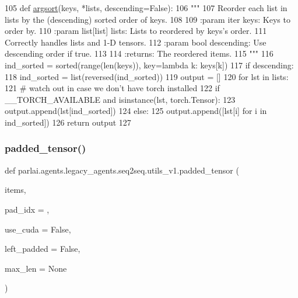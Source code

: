 \begin{DoxyCode}
105 \textcolor{keyword}{def }\hyperlink{namespaceparlai_1_1agents_1_1legacy__agents_1_1seq2seq_1_1utils__v1_a1521e559b740f741ebb47b8755202bb2}{argsort}(keys, *lists, descending=False):
106     \textcolor{stringliteral}{"""}
107 \textcolor{stringliteral}{    Reorder each list in lists by the (descending) sorted order of keys.}
108 \textcolor{stringliteral}{}
109 \textcolor{stringliteral}{    :param iter keys: Keys to order by.}
110 \textcolor{stringliteral}{    :param list[list] lists: Lists to reordered by keys's order.}
111 \textcolor{stringliteral}{                             Correctly handles lists and 1-D tensors.}
112 \textcolor{stringliteral}{    :param bool descending: Use descending order if true.}
113 \textcolor{stringliteral}{}
114 \textcolor{stringliteral}{    :returns: The reordered items.}
115 \textcolor{stringliteral}{    """}
116     ind\_sorted = sorted(range(len(keys)), key=\textcolor{keyword}{lambda} k: keys[k])
117     \textcolor{keywordflow}{if} descending:
118         ind\_sorted = list(reversed(ind\_sorted))
119     output = []
120     \textcolor{keywordflow}{for} lst \textcolor{keywordflow}{in} lists:
121         \textcolor{comment}{# watch out in case we don't have torch installed}
122         \textcolor{keywordflow}{if} \_\_TORCH\_AVAILABLE \textcolor{keywordflow}{and} isinstance(lst, torch.Tensor):
123             output.append(lst[ind\_sorted])
124         \textcolor{keywordflow}{else}:
125             output.append([lst[i] \textcolor{keywordflow}{for} i \textcolor{keywordflow}{in} ind\_sorted])
126     \textcolor{keywordflow}{return} output
127 \end{DoxyCode}
\mbox{\label{namespaceparlai_1_1agents_1_1legacy__agents_1_1seq2seq_1_1utils__v1_adb5a414ae439f14c54e8c760b91cc4c8}} 
\subsubsection{\texorpdfstring{padded\+\_\+tensor()}{padded\_tensor()}}
{\footnotesize\ttfamily def parlai.\+agents.\+legacy\+\_\+agents.\+seq2seq.\+utils\+\_\+v1.\+padded\+\_\+tensor (\begin{DoxyParamCaption}\item[{}]{items,  }\item[{}]{pad\+\_\+idx = {},  }\item[{}]{use\+\_\+cuda = {\ttfamily False},  }\item[{}]{left\+\_\+padded = {\ttfamily False},  }\item[{}]{max\+\_\+len = {\ttfamily None} }\end{DoxyParamCaption})}

